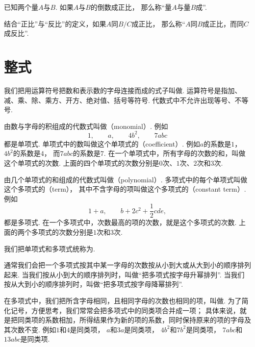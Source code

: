 \begin{definition}
已知两个量\(A\)与\(B\).
如果\(A\)与\(B\)的倒数成正比，
那么称“量\(A\)与量\(B\)成”.
\end{definition}

结合“正比”与“反比”的定义，如果\(A\)同\(B/C\)成正比，
那么称“\(A\)同\(B\)成正比，而同\(C\)成反比”.

\section{整式}
我们把用运算符号把数和表示数的字母连接而成的式子叫做.
运算符号是指加、减、乘、除、乘方、开方、绝对值、括号等符号.
代数式中不允许出现等号、不等号.

由数与字母的积组成的代数式叫做（monomial）.
例如\[
	1, \qquad
	a, \qquad
	4b^2, \qquad
	7abc
\]都是单项式.
单项式中的数叫做这个单项式的（coefficient）.
例如\(a\)的系数是\(1\)，
\(4b^2\)的系数是\(4\)，
而\(7abc\)的系数是\(7\).
在一个单项式中，所有字母的次数的和，叫做这个单项式的次数.
上面的四个单项式的次数分别是\(0\)次、\(1\)次、\(2\)次和\(3\)次.

由几个单项式的和组成的代数式叫做（polynomial）.
多项式中的每个单项式叫做这个多项式的（term），
其中不含字母的项叫做这个多项式的（constant term）.
例如\[
	1+a, \qquad
	b+2c^2+\frac12cde,
\]都是多项式.
在一个多项式中，次数最高的项的次数，就是这个多项式的次数.
上面的两个多项式的次数分别是\(1\)次和\(3\)次.

我们把单项式和多项式统称为.

通常我们会把一个多项式按其中某一字母的次数按从小到大或从大到小的顺序排列起来.
当我们按从小到大的顺序排列时，叫做“把多项式按字母升幂排列”.
当我们按从大到小的顺序排列时，叫做“把多项式按字母降幂排列”.

在多项式中，我们把所含字母相同，且相同字母的次数也相同的项，叫做.
为了简化记号，方便思考，我们常常会把多项式中的同类项合并成一项；
具体来说，就是把同类项的系数相加，所得结果作为新的项的系数，同时保持原来的项的字母及其次数不变.
例如\(1\)和\(4\)是同类项，
\(a\)和\(3a\)是同类项，
\(4b^2\)和\(7b^2\)是同类项，
\(7abc\)和\(13abc\)是同类项.

